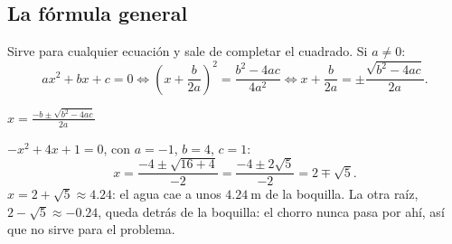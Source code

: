 \documentclass[11pt,a4paper]{article}
\begin{document}
\subsection{La fórmula general}
Sirve para cualquier ecuación y sale de completar el cuadrado. Si $a\neq0$:
\[ ax^2+bx+c=0\iff\left(x+\frac{b}{2a}\right)^2=\frac{b^2-4ac}{4a^2}\iff x+\frac{b}{2a}=\pm\frac{\sqrt{b^2-4ac}}{2a}. \]
\begin{clavebox}
$\displaystyle x=\frac{-b\pm\sqrt{b^2-4ac}}{2a}$
\end{clavebox}
\begin{ejemplo}
$-x^2+4x+1=0$, con $a=-1$, $b=4$, $c=1$:
\[ x=\frac{-4\pm\sqrt{16+4}}{-2}=\frac{-4\pm2\sqrt5}{-2}=2\mp\sqrt5 . \]
$x=2+\sqrt5\approx4.24$: el agua cae a unos $\SI{4.24}{\metre}$ de la boquilla. La otra raíz, $2-\sqrt5\approx-0.24$,
queda detrás de la boquilla: el chorro nunca pasa por ahí, así que no sirve para el problema.
\end{ejemplo}
\end{document}
